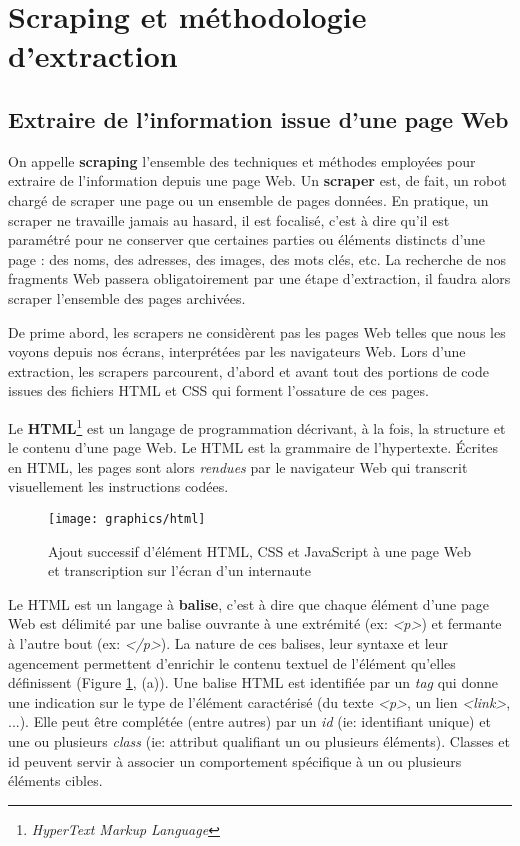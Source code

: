 \documentclass[symmetric,justified,marginals=raggedouter]{tufte-book}
\begin{document}
\section{Scraping et méthodologie d'extraction}
\label{sec:5_scraping}

\subsection{Extraire de l'information issue d'une page Web}

\noindent On appelle \textbf{scraping} l'ensemble des techniques et méthodes employées pour extraire de l'information depuis une page Web. Un \textbf{scraper} est, de fait, un robot chargé de scraper une page ou un ensemble de pages données. En pratique, un scraper ne travaille jamais au hasard, il est focalisé, c'est à dire qu'il est paramétré pour ne conserver que certaines parties ou éléments distincts d'une page : des noms, des adresses, des images, des mots clés, etc. La recherche de nos fragments Web passera obligatoirement par une étape d'extraction, il faudra alors scraper l'ensemble des pages archivées.

De prime abord, les scrapers ne considèrent pas les pages Web telles que nous les voyons depuis nos écrans, interprétées par les navigateurs Web. Lors d'une extraction, les scrapers parcourent, d'abord et avant tout des portions de code issues des fichiers HTML et CSS qui forment l'ossature de ces pages. 

Le \textbf{HTML}\footnote{\textit{HyperText Markup Language}} est un langage de programmation décrivant, à la fois, la structure et le contenu d'une page Web. Le HTML est la grammaire de l'hypertexte. Écrites en HTML, les pages sont alors \textit{rendues} par le navigateur Web qui transcrit visuellement les instructions codées.  

\begin{figure}%
  \texttt{[image: graphics/html]}
  \caption{Ajout successif d'élément HTML, CSS et JavaScript à une page Web et transcription sur l'écran d'un internaute}
  \label{fig:html}
\end{figure}

\noindent Le HTML est un langage à \textbf{balise}, c'est à dire que chaque élément d'une page Web est délimité par une balise ouvrante à une extrémité (ex: \textit{<p>}) et fermante à l'autre bout (ex: \textit{</p>}). La nature de ces balises, leur syntaxe et leur agencement permettent d'enrichir le contenu textuel de l'élément qu'elles définissent (Figure \ref{fig:html}, (a)). Une balise HTML est identifiée par un \textit{tag} qui donne une indication sur le type de l'élément caractérisé (du texte \textit{<p>}, un lien \textit{<link>}, ...). Elle peut être complétée (entre autres) par un \textit{id} (ie: identifiant unique) et une ou plusieurs \textit{class} (ie: attribut qualifiant un ou plusieurs éléments). Classes et id peuvent servir à associer un comportement spécifique à un ou plusieurs éléments cibles.
\end{document}
